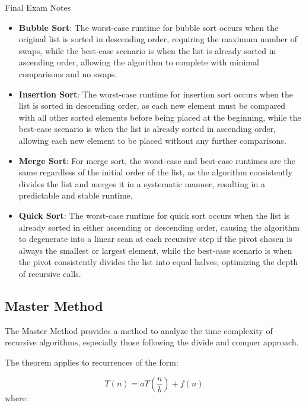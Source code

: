 \begin{examnotes}{Final Exam Notes}
    \begin{itemize}
        \item \textbf{Bubble Sort}: The worst-case runtime for bubble sort occurs when the original list is sorted in descending order, requiring the maximum number of swaps, while the best-case scenario 
        is when the list is already sorted in ascending order, allowing the algorithm to complete with minimal comparisons and no swaps.
        \item \textbf{Insertion Sort}: The worst-case runtime for insertion sort occurs when the list is sorted in descending order, as each new element must be compared with all other sorted elements 
        before being placed at the beginning, while the best-case scenario is when the list is already sorted in ascending order, allowing each new element to be placed without any further comparisons.
        \item \textbf{Merge Sort}: For merge sort, the worst-case and best-case runtimes are the same regardless of the initial order of the list, as the algorithm consistently divides the list and 
        merges it in a systematic manner, resulting in a predictable and stable runtime.
        \item \textbf{Quick Sort}: The worst-case runtime for quick sort occurs when the list is already sorted in either ascending or descending order, causing the algorithm to degenerate into a linear 
        scan at each recursive step if the pivot chosen is always the smallest or largest element, while the best-case scenario is when the pivot consistently divides the list into equal halves, optimizing 
        the depth of recursive calls.
    \end{itemize}

    \subsection*{Master Method}

    The Master Method provides a method to analyze the time complexity of recursive algorithms, especially those following the divide and conquer approach.

    \begin{highlight}
        The theorem applies to recurrences of the form:
    
        \begin{equation*}
            T(n) = aT\left(\frac{n}{b}\right) + f(n)
        \end{equation*}
        where:
    

\end{highlight}
\end{examnotes}
